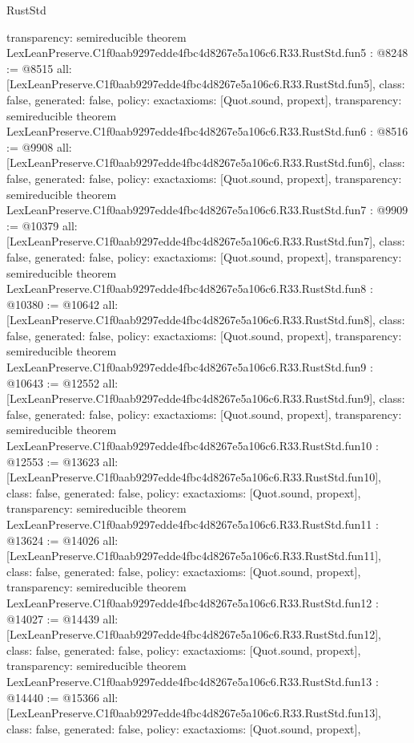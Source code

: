 \begin{lexlean}{RustStd}
\begin{coremodule}
{  transparency: semireducible
}
theorem LexLeanPreserve.C1f0aab9297edde4fbc4d8267e5a106c6.R33.RustStd.fun5 : @8248 := @8515 {
  all: [LexLeanPreserve.C1f0aab9297edde4fbc4d8267e5a106c6.R33.RustStd.fun5],
  class: false,
  generated: false,
  policy: exact{axioms: [Quot.sound, propext]},
  transparency: semireducible
}
theorem LexLeanPreserve.C1f0aab9297edde4fbc4d8267e5a106c6.R33.RustStd.fun6 : @8516 := @9908 {
  all: [LexLeanPreserve.C1f0aab9297edde4fbc4d8267e5a106c6.R33.RustStd.fun6],
  class: false,
  generated: false,
  policy: exact{axioms: [Quot.sound, propext]},
  transparency: semireducible
}
theorem LexLeanPreserve.C1f0aab9297edde4fbc4d8267e5a106c6.R33.RustStd.fun7 : @9909 := @10379 {
  all: [LexLeanPreserve.C1f0aab9297edde4fbc4d8267e5a106c6.R33.RustStd.fun7],
  class: false,
  generated: false,
  policy: exact{axioms: [Quot.sound, propext]},
  transparency: semireducible
}
theorem LexLeanPreserve.C1f0aab9297edde4fbc4d8267e5a106c6.R33.RustStd.fun8 : @10380 := @10642 {
  all: [LexLeanPreserve.C1f0aab9297edde4fbc4d8267e5a106c6.R33.RustStd.fun8],
  class: false,
  generated: false,
  policy: exact{axioms: [Quot.sound, propext]},
  transparency: semireducible
}
theorem LexLeanPreserve.C1f0aab9297edde4fbc4d8267e5a106c6.R33.RustStd.fun9 : @10643 := @12552 {
  all: [LexLeanPreserve.C1f0aab9297edde4fbc4d8267e5a106c6.R33.RustStd.fun9],
  class: false,
  generated: false,
  policy: exact{axioms: [Quot.sound, propext]},
  transparency: semireducible
}
theorem LexLeanPreserve.C1f0aab9297edde4fbc4d8267e5a106c6.R33.RustStd.fun10 : @12553 := @13623 {
  all: [LexLeanPreserve.C1f0aab9297edde4fbc4d8267e5a106c6.R33.RustStd.fun10],
  class: false,
  generated: false,
  policy: exact{axioms: [Quot.sound, propext]},
  transparency: semireducible
}
theorem LexLeanPreserve.C1f0aab9297edde4fbc4d8267e5a106c6.R33.RustStd.fun11 : @13624 := @14026 {
  all: [LexLeanPreserve.C1f0aab9297edde4fbc4d8267e5a106c6.R33.RustStd.fun11],
  class: false,
  generated: false,
  policy: exact{axioms: [Quot.sound, propext]},
  transparency: semireducible
}
theorem LexLeanPreserve.C1f0aab9297edde4fbc4d8267e5a106c6.R33.RustStd.fun12 : @14027 := @14439 {
  all: [LexLeanPreserve.C1f0aab9297edde4fbc4d8267e5a106c6.R33.RustStd.fun12],
  class: false,
  generated: false,
  policy: exact{axioms: [Quot.sound, propext]},
  transparency: semireducible
}
theorem LexLeanPreserve.C1f0aab9297edde4fbc4d8267e5a106c6.R33.RustStd.fun13 : @14440 := @15366 {
  all: [LexLeanPreserve.C1f0aab9297edde4fbc4d8267e5a106c6.R33.RustStd.fun13],
  class: false,
  generated: false,
  policy: exact{axioms: [Quot.sound, propext]},
}
\end{coremodule}
\end{lexlean}
